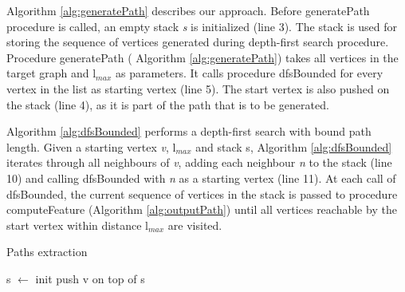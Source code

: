 \documentclass{l4proj}
\begin{document}
Algorithm \ref{alg:generatePath} describes our approach. Before generatePath procedure is called, an empty stack \emph{s} is initialized (line 3). The stack is used for storing the sequence of vertices generated during depth-first search procedure. Procedure generatePath ( \textrm{Algorithm \ref{alg:generatePath}}) takes all vertices in the target graph and l$_{max}$ as parameters. It calls procedure dfsBounded for every vertex in the list as starting vertex (line 5). The start vertex is also pushed on the stack (line 4), as it is part of the path that is to be generated.

Algorithm \ref{alg:dfsBounded} performs a depth-first search with bound path length. Given a starting vertex \emph{v}, l$_{max}$ and stack s, Algorithm \ref{alg:dfsBounded} iterates through all neighbours of \emph{v}, adding each neighbour \emph{n} to the stack (line 10) and calling dfsBounded with \emph{n} as a starting vertex (line 11). At each call of dfsBounded, the current sequence of vertices in the stack is passed to procedure computeFeature (Algorithm \ref{alg:outputPath}) until all vertices reachable by the start vertex within distance l$_{max}$ are visited.

\begin{algorithm}
\centering
\caption{Paths extraction}
\label{alg:generatePath}
\begin{algorithmic}[1]
	\State s $\gets$ init 
	\State push v on top of s
	\State {}
\EndFor
\EndProcedure
\end{algorithmic}
\end{algorithm}
\end{document}
